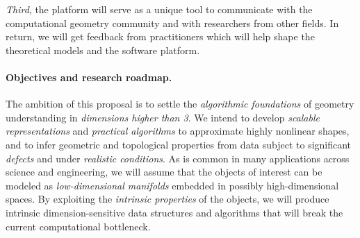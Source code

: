 {\em Third}, the platform will serve as a unique tool to communicate with the computational geometry community and with researchers from other fields. 
 In return, we will get feedback from practitioners which will help shape the theoretical models and the software platform.

\paragraph{Objectives and research roadmap.}
The ambition of this proposal is to settle the {\em algorithmic
foundations} of geometry understanding in {\em dimensions higher than
3}.  We intend to develop {\em scalable representations} and {\em
practical algorithms} to approximate highly nonlinear shapes, and to
infer geometric and topological properties from data subject to
significant {\em defects} and under {\em realistic conditions}.
%
As is common in many applications across science and engineering, we
will assume that the objects of interest can be modeled as {\em
  low-dimensional manifolds} embedded in possibly high-dimensional
spaces. By exploiting the {\em intrinsic properties} of the objects,
we will produce intrinsic dimension-sensitive data structures and algorithms
that will break the current computational
bottleneck.  %

